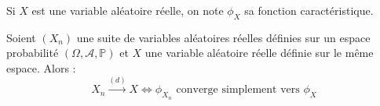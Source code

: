 





  \begin{notation}
    Si $X$ est une variable aléatoire réelle, on note $\phi_X$ sa fonction caractéristique.
  \end{notation}


  \begin{theorem}[Lévy]
    \label{theoreme-central-limite-1}
    Soient $(X_n)$ une suite de variables aléatoires réelles définies sur un espace probabilité $(\Omega, \mathcal{A}, \mathbb{P})$ et $X$ une variable aléatoire réelle définie sur le même espace. Alors :
    \[ X_n \overset{(d)}{\longrightarrow} X \iff \phi_{X_n} \text{ converge simplement vers } \phi_X \]
  \end{theorem}

